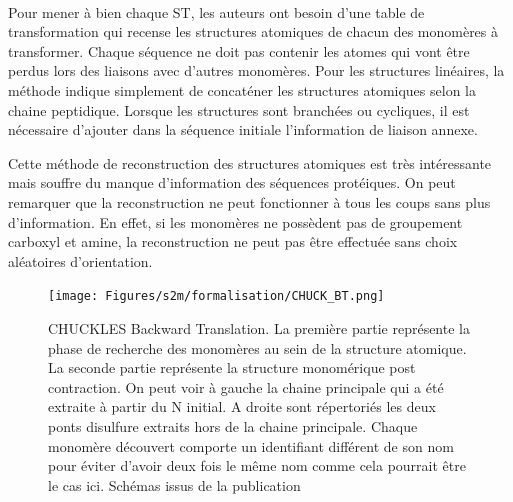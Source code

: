 \documentclass[12pt,french,twoside]{report}
\begin{document}
\paragraph{}Pour mener à bien chaque ST, les auteurs ont besoin d'une table de transformation qui recense les structures atomiques de chacun des monomères à transformer.
Chaque séquence ne doit pas contenir les atomes qui vont être perdus lors des liaisons avec d'autres monomères.
Pour les structures linéaires, la méthode indique simplement de concaténer les structures atomiques selon la chaine peptidique.
Lorsque les structures sont branchées ou cycliques, il est nécessaire d'ajouter dans la séquence initiale l'information de liaison annexe.

Cette méthode de reconstruction des structures atomiques est très intéressante mais souffre du manque d'information des séquences protéiques.
On peut remarquer que la reconstruction ne peut fonctionner à tous les coups sans plus d'information.
En effet, si les monomères ne possèdent pas de groupement carboxyl et amine, la reconstruction ne peut pas être effectuée sans choix aléatoires d'orientation.

\begin{figure}[!ht]
  \begin{center}
    \texttt{[image: Figures/s2m/formalisation/CHUCK\_BT.png]}
    \caption{\label{chuck_bt}CHUCKLES Backward Translation.
    La première partie représente la phase de recherche des monomères au sein de la structure atomique.
    La seconde partie représente la structure monomérique post contraction.
    On peut voir à gauche la chaine principale qui a été extraite à partir du N initial.
    A droite sont répertoriés les deux ponts disulfure extraits hors de la chaine principale.
    Chaque monomère découvert comporte un identifiant différent de son nom pour éviter d'avoir deux fois le même nom comme cela pourrait être le cas ici.
    Schémas issus de la publication}
  \end{center}
\end{figure}
\end{document}
